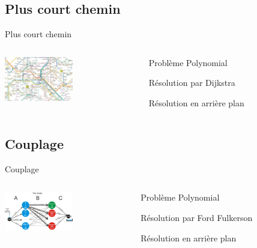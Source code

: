 \documentclass{beamer}
\begin{document}
	\subsection{Plus court chemin}
		\begin{frame}{Plus court chemin}
        \begin{columns}
            \begin{column}{0cm}
                \includegraphics[width=3cm]{images/metro.jpg}
            \end{column}
            \begin{column}{8cm}
                \begin{description}\itemsep15pt
                    \item Problème Polynomial
                    \item Résolution par Dijkstra
                    \item Résolution en arrière plan
                \end{description}
            \end{column}
        \end{columns}
		\end{frame}
	\subsection{Couplage}
		\begin{frame}{Couplage}
           \begin{columns}
            \begin{column}{0cm}
                \includegraphics[width=3cm]{images/exemple_couplage.png}
            \end{column}
            \begin{column}{8cm}
                \begin{description}\itemsep15pt
                    \item Problème Polynomial
                    \item Résolution par Ford Fulkerson
                    \item Résolution en arrière plan
                \end{description}
            \end{column}
        \end{columns}
		\end{frame}
\end{document}
